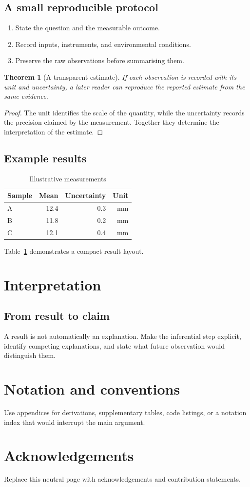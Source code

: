 \documentclass[11pt,twoside]{book}
\newtheorem{theorem}{Theorem}[chapter]
\begin{document}
\section{A small reproducible protocol}
\begin{enumerate}[label=\arabic*.]
  \item State the question and the measurable outcome.
  \item Record inputs, instruments, and environmental conditions.
  \item Preserve the raw observations before summarising them.
\end{enumerate}
\begin{theorem}[A transparent estimate]\label{thm:estimate}
If each observation is recorded with its unit and uncertainty, a later reader
can reproduce the reported estimate from the same evidence.
\end{theorem}
\begin{proof}
The unit identifies the scale of the quantity, while the uncertainty records
the precision claimed by the measurement. Together they determine the
interpretation of the estimate.
\end{proof}
\section{Example results}
\begin{table}[ht]
\centering
\caption{Illustrative measurements}\label{tab:measurements}
\begin{tabular}{lrrr}
\toprule Sample & Mean & Uncertainty & Unit\\\midrule
A & 12.4 & 0.3 & mm\\ B & 11.8 & 0.2 & mm\\ C & 12.1 & 0.4 & mm\\
\bottomrule
\end{tabular}
\end{table}
Table~\ref{tab:measurements} demonstrates a compact result layout.
\chapter{Interpretation}
\section{From result to claim}
A result is not automatically an explanation. Make the inferential step
explicit, identify competing explanations, and state what future observation
would distinguish them.
\backmatter
\appendix
\chapter{Notation and conventions}
Use appendices for derivations, supplementary tables, code listings, or a
notation index that would interrupt the main argument.
\chapter*{Acknowledgements}
Replace this neutral page with acknowledgements and contribution statements.
\end{document}
